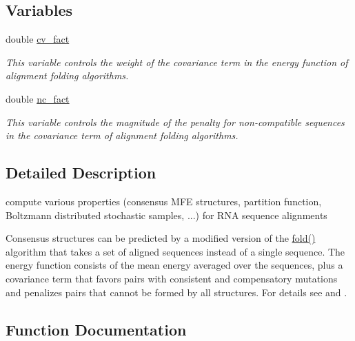 \subsection*{Variables}
\begin{DoxyCompactItemize}
\item 
double \hyperlink{group__consensus__fold_gaf3cbac6ff5d706d6e414677841ddf94c}{cv\+\_\+fact}
\begin{DoxyCompactList}\small\item\em This variable controls the weight of the covariance term in the energy function of alignment folding algorithms. \end{DoxyCompactList}\item 
double \hyperlink{group__consensus__fold_ga502948a122a2af5b914355b1f3ea2f61}{nc\+\_\+fact}
\begin{DoxyCompactList}\small\item\em This variable controls the magnitude of the penalty for non-\/compatible sequences in the covariance term of alignment folding algorithms. \end{DoxyCompactList}\end{DoxyCompactItemize}


\subsection{Detailed Description}
compute various properties (consensus M\+F\+E structures, partition function, Boltzmann distributed stochastic samples, ...) for R\+N\+A sequence alignments 

Consensus structures can be predicted by a modified version of the \hyperlink{group__mfe__fold__single_gaadafcb0f140795ae62e5ca027e335a9b}{fold()} algorithm that takes a set of aligned sequences instead of a single sequence. The energy function consists of the mean energy averaged over the sequences, plus a covariance term that favors pairs with consistent and compensatory mutations and penalizes pairs that cannot be formed by all structures. For details see \cite{hofacker:2002} and \cite{bernhart:2008}. 

\subsection{Function Documentation}
\hypertarget{group__consensus__fold_ga1c48869c03b49a342bf4cbdd61900081}{}
